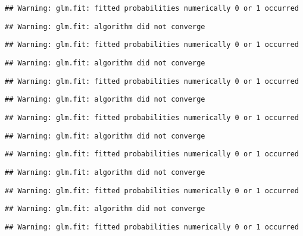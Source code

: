 \documentclass[]{article}
\begin{document}
\begin{verbatim}
## Warning: glm.fit: fitted probabilities numerically 0 or 1 occurred
\end{verbatim}

\begin{verbatim}
## Warning: glm.fit: algorithm did not converge
\end{verbatim}

\begin{verbatim}
## Warning: glm.fit: fitted probabilities numerically 0 or 1 occurred
\end{verbatim}

\begin{verbatim}
## Warning: glm.fit: algorithm did not converge
\end{verbatim}

\begin{verbatim}
## Warning: glm.fit: fitted probabilities numerically 0 or 1 occurred
\end{verbatim}

\begin{verbatim}
## Warning: glm.fit: algorithm did not converge
\end{verbatim}

\begin{verbatim}
## Warning: glm.fit: fitted probabilities numerically 0 or 1 occurred
\end{verbatim}

\begin{verbatim}
## Warning: glm.fit: algorithm did not converge
\end{verbatim}

\begin{verbatim}
## Warning: glm.fit: fitted probabilities numerically 0 or 1 occurred
\end{verbatim}

\begin{verbatim}
## Warning: glm.fit: algorithm did not converge
\end{verbatim}

\begin{verbatim}
## Warning: glm.fit: fitted probabilities numerically 0 or 1 occurred
\end{verbatim}

\begin{verbatim}
## Warning: glm.fit: algorithm did not converge
\end{verbatim}

\begin{verbatim}
## Warning: glm.fit: fitted probabilities numerically 0 or 1 occurred
\end{verbatim}
\end{document}
